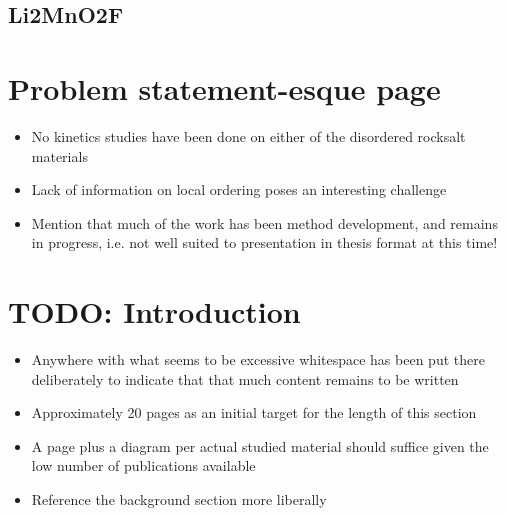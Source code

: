 \subsection{Li2MnO2F}
\citet{Chen2015,Dambournet2018,Kim2015,House2018,Urban2014}

\section{Problem statement-esque page}
\begin{itemize}
	\item No kinetics studies have been done on either of the disordered rocksalt materials
	\item Lack of information on local ordering poses an interesting challenge
	\item Mention that much of the work has been method development, and remains in progress, i.e. not well suited to presentation in thesis format at this time!
\end{itemize}

\newpage
\section{TODO: Introduction}
\begin{itemize}
	\item Anywhere with what seems to be excessive whitespace has been put there deliberately to indicate that that much content remains to be written
	\item Approximately 20 pages as an initial target for the length of this section
	\item A page plus a diagram per actual studied material should suffice given the low number of publications available
	\item Reference the background section more liberally
\end{itemize}

